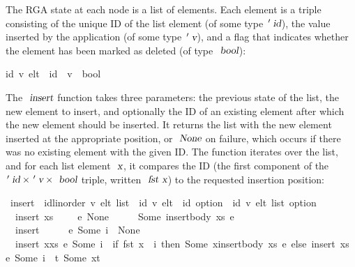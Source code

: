 The RGA state at each node is a list of elements.
Each element is a triple consisting of the unique ID of the list element (of some type $\isacharprime\isa{id}$), the value inserted by the application (of some type $\isacharprime\isa{v}$), and a flag that indicates whether the element has been marked as deleted (of type $\isa{bool}$):
\begin{isabelle}
 {\isacharparenleft}{\isacharprime}id{\isacharcomma}\ {\isacharprime}v{\isacharparenright}\ elt\ {\isacharequal}\ {\isachardoublequoteopen}{\isacharprime}id\ {\isasymtimes}\ {\isacharprime}v\ {\isasymtimes}\ bool{\isachardoublequoteclose}%
\end{isabelle}

The $\isa{insert}$ function takes three parameters: the previous state of the list, the new element to insert, and optionally the ID of an existing element after which the new element should be inserted.
It returns the list with the new element inserted at the appropriate position, or $\isa{None}$ on failure, which occurs if there was no existing element with the given ID.
The function iterates over the list, and for each list element $\isa{x}$, it compares the ID (the first component of the $\isacharprime\isa{id} \mathbin{\isasymtimes} \isacharprime\isa{v} \mathbin{\isasymtimes} \isa{bool}$ triple, written $\isa{fst x}$) to the requested insertion position:
\begin{isabelle}
\ insert\ {\isacharcolon}{\isacharcolon}\ {\isachardoublequoteopen}{\isacharparenleft}{\isacharprime}id{\isacharcolon}{\isacharcolon}{\isacharbraceleft}linorder{\isacharbraceright}{\isacharcomma}\ {\isacharprime}v{\isacharparenright}\ elt\ list\ {\isasymRightarrow}\ {\isacharparenleft}{\isacharprime}id{\isacharcomma}\ {\isacharprime}v{\isacharparenright}\ elt\ {\isasymRightarrow}\ {\isacharprime}id\ option\ {\isasymRightarrow}\ {\isacharparenleft}{\isacharprime}id{\isacharcomma}\ {\isacharprime}v{\isacharparenright}\ elt\ list\ option{\isachardoublequoteclose}\ \isanewline
\ \ {\isachardoublequoteopen}insert\ xs\ \ \ \ \ e\ None\ \ \ \ \ {\isacharequal}\ Some\ {\isacharparenleft}insert{\isacharunderscore}body\ xs\ e{\isacharparenright}{\isachardoublequoteclose}\ {\isacharbar}\isanewline
\ \ {\isachardoublequoteopen}insert\ {\isacharbrackleft}{\isacharbrackright}\ \ \ \ \ e\ {\isacharparenleft}Some\ i{\isacharparenright}\ {\isacharequal}\ None{\isachardoublequoteclose}\ {\isacharbar}\isanewline
\ \ {\isachardoublequoteopen}insert\ {\isacharparenleft}x{\isacharhash}xs{\isacharparenright}\ e\ {\isacharparenleft}Some\ i{\isacharparenright}\ {\isacharequal}\ {\isacharparenleft}if\ fst\ x\ {\isacharequal}\ i\ then\ Some\ {\isacharparenleft}x{\isacharhash}insert{\isacharunderscore}body\ xs\ e{\isacharparenright}\ else\ insert\ xs\ e\ {\isacharparenleft}Some\ i{\isacharparenright}\ {\isasymbind}\ {\isacharparenleft}{\isasymlambda}t{\isachardot}\ Some\ {\isacharparenleft}x{\isacharhash}t{\isacharparenright}{\isacharparenright}{\isacharparenright}{\isachardoublequoteclose}
\end{isabelle}
